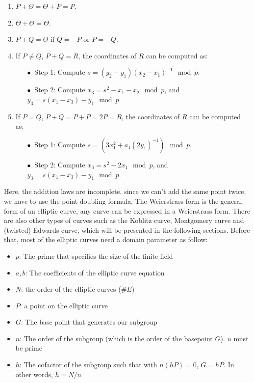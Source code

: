 \begin{enumerate}
  \item $P + \Theta = \Theta + P = P$.
  \item $\Theta + \Theta = \Theta$.
  \item $P + Q = \Theta$ if $Q = -P$ or $P = -Q$.
  \item If $P \neq Q$, $P + Q = R$, the coordinates of $R$ can be computed as:

        \begin{itemize}
        \addtolength{\itemindent}{1cm}
          \item[$\bullet \ $ Step 1:] Compute $s = (y_2 - y_1) (x_2 - x_1)^{-1} \mod p$.
          \item[$\bullet \ $ Step 2:] Compute $x_3 = s^2 - x_1 - x_2 \mod p$, and $y_3 = s(x_1 - x_3) - y_1 \mod p$.
        \end{itemize}

  \item If $P = Q$, $P + Q = P + P = 2P = R$, the coordinates of $R$ can be computed as:

        \begin{itemize}
        \addtolength{\itemindent}{1cm}
          \item[$\bullet \ $ Step 1:] Compute $s = (3x_1^2 + a_1 (2y_1)^{-1}) \mod p$.
          \item[$\bullet \ $ Step 2:] Compute $x_3 = s^2 - 2x_1 \mod p$, and $y_3 = s(x_1 - x_3) - y_1 \mod p$.
        \end{itemize}

\end{enumerate}

Here, the addition laws are incomplete, since we can’t add the same point twice, we have to use the point doubling formula. The Weierstrass form is the general form of an elliptic curve, any curve can be expressed in a Weierstrass form. There are also other types of curves such as the Koblitz curve, Montgomery curve and (twisted) Edwards curve, which will be presented in the following sections. Before that, most of the elliptic curves need a domain parameter as follow:

\begin{itemize}
  \item$p$: The prime that specifies the size of the finite field
  \item$a, b$: The coefficients of the elliptic curve equation
  \item$N$: the order of the elliptic curves ($\#E$)
  \item $P$: a point on the elliptic curve
        \item$G$: The base point that generates our subgroup
        \item$n$: The order of the subgroup (which is the order of the basepoint $G$). $n$ must be prime
        \item$h$: The cofactor of the subgroup such that with $n(hP)=0$, $G = hP$. In other words, $h=N/n$
\end{itemize}

